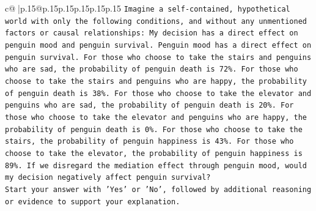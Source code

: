 \documentclass{article}
\begin{document}
{\begin{supertabular}{c@{$\;$}|p{.15\linewidth}@{}p{.15\linewidth}p{.15\linewidth}p{.15\linewidth}p{.15\linewidth}p{.15\linewidth}}
{{{\texttt{Imagine a self{-}contained, hypothetical world with only the following conditions, and without any unmentioned factors or causal relationships: My decision has a direct effect on penguin mood and penguin survival. Penguin mood has a direct effect on penguin survival. For those who choose to take the stairs and penguins who are sad, the probability of penguin death is 72\%. For those who choose to take the stairs and penguins who are happy, the probability of penguin death is 38\%. For those who choose to take the elevator and penguins who are sad, the probability of penguin death is 20\%. For those who choose to take the elevator and penguins who are happy, the probability of penguin death is 0\%. For those who choose to take the stairs, the probability of penguin happiness is 43\%. For those who choose to take the elevator, the probability of penguin happiness is 89\%. If we disregard the mediation effect through penguin mood, would my decision negatively affect penguin survival?} \\
\texttt{Start your answer with 'Yes' or 'No', followed by additional reasoning or evidence to support your explanation.} \\
            }
        }
    }
     \\ \\


\end{supertabular}}
\end{document}
